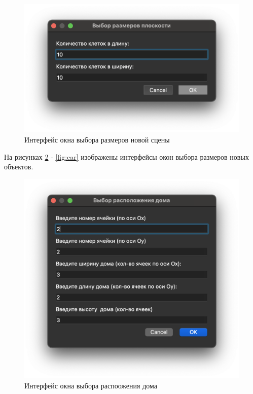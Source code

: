 \documentclass[a4paper,14pt, unknownkeysallowed]{extreport}
\begin{document}
\begin{figure}[h]
	\centering
	\includegraphics[scale=0.55]{img/scene.png}
	\caption{Интерфейс окна выбора размеров новой сцены}
	\label{fig:scene}
\end{figure} 

На рисунках \ref{fig:house} - \ref{fig:car} изображены интерфейсы окон выбора размеров новых объектов. 

\begin{figure}[h]
	\centering
	\includegraphics[scale=0.55]{img/house.png}
	\caption{Интерфейс окна выбора распоожения дома}
	\label{fig:house}
\end{figure} 
\end{document}
